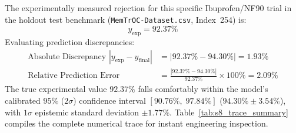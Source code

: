 \documentclass[11pt]{article}
\begin{document}
The experimentally measured rejection for this specific Ibuprofen/NF90 trial in the holdout test benchmark (\texttt{MemTrOC-Dataset.csv}, Index~254) is:
\begin{equation}
y_{\mathrm{exp}} = 92.37\%
\end{equation}
Evaluating prediction discrepancies:
\begin{align}
\text{Absolute Discrepancy } |y_{\mathrm{exp}} - \hat{y}_{\mathrm{final}}| &= |92.37\% - 94.30\%| = \mathbf{1.93\%} \\
\text{Relative Prediction Error} &= \frac{|92.37\% - 94.30\%|}{92.37\%} \times 100\% = \mathbf{2.09\%}
\end{align}
The true experimental value $92.37\%$ falls comfortably within the model's calibrated $95\%$ ($2\sigma$) confidence interval $[90.76\%, \; 97.84\%]$ ($94.30\% \pm 3.54\%$), with $1\sigma$ epistemic standard deviation $\pm 1.77\%$. Table~\ref{tab:s8_trace_summary} compiles the complete numerical trace for instant engineering inspection.
\end{document}
